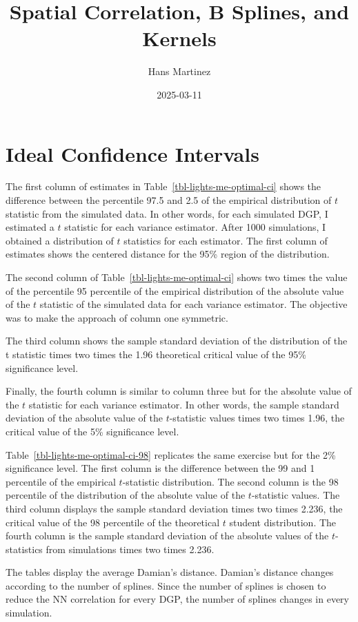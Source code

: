 \documentclass[
]{article}
\title{Spatial Correlation, B Splines, and Kernels}
\author{Hans Martinez}
\date{2025-03-11}
\begin{document}
\maketitle

\section{Ideal Confidence Intervals}\label{ideal-confidence-intervals}

The first column of estimates in Table~\ref{tbl-lights-me-optimal-ci}
shows the difference between the percentile 97.5 and 2.5 of the
empirical distribution of \(t\) statistic from the simulated data. In
other words, for each simulated DGP, I estimated a \(t\) statistic for
each variance estimator. After 1000 simulations, I obtained a
distribution of \(t\) statistics for each estimator. The first column of
estimates shows the centered distance for the 95\% region of the
distribution.

The second column of Table~\ref{tbl-lights-me-optimal-ci} shows two
times the value of the percentile 95 percentile of the empirical
distribution of the absolute value of the \(t\) statistic of the
simulated data for each variance estimator. The objective was to make
the approach of column one symmetric.

The third column shows the sample standard deviation of the distribution
of the t statistic times two times the 1.96 theoretical critical value
of the 95\% significance level.

Finally, the fourth column is similar to column three but for the
absolute value of the \(t\) statistic for each variance estimator. In
other words, the sample standard deviation of the absolute value of the
\(t\)-statistic values times two times 1.96, the critical value of the
5\% significance level.

Table~\ref{tbl-lights-me-optimal-ci-98} replicates the same exercise but
for the 2\% significance level. The first column is the difference
between the 99 and 1 percentile of the empirical \(t\)-statistic
distribution. The second column is the 98 percentile of the distribution
of the absolute value of the \(t\)-statistic values. The third column
displays the sample standard deviation times two times 2.236, the
critical value of the 98 percentile of the theoretical \(t\) student
distribution. The fourth column is the sample standard deviation of the
absolute values of the \(t\)-statistics from simulations times two times
2.236.

The tables display the average Damian's distance. Damian's distance
changes according to the number of splines. Since the number of splines
is chosen to reduce the NN correlation for every DGP, the number of
splines changes in every simulation.
\end{document}
